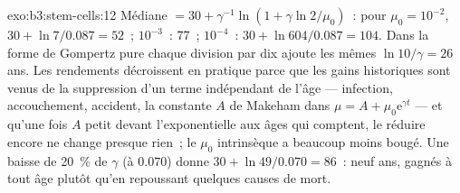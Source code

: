 \begin{solution}{exo:b3:stem-cells:12}
Médiane $= 30 + \gamma^{-1}\ln(1 + \gamma\ln 2/\mu_{0})$~: pour $\mu_{0} =
10^{-2}$, $30 + \ln 7/0.087 = 52$~; $10^{-3}$~: 77~; $10^{-4}$~: $30 +
\ln 604/0.087 = 104$. Dans la forme de Gompertz pure chaque division par
dix ajoute les mêmes $\ln 10/\gamma = 26$ ans. Les rendements
décroissent en pratique parce que les gains historiques sont venus de la
suppression d'un terme indépendant de l'âge --- infection, accouchement,
accident, la constante $A$ de Makeham dans $\mu = A
+ \mu_{0}\mathrm{e}^{\gamma t}$ --- et qu'une fois $A$ petit devant
l'exponentielle aux âges qui comptent, le réduire encore ne change
presque rien~; le $\mu_{0}$ intrinsèque a beaucoup moins bougé. Une
baisse de \qty{20}{\%} de $\gamma$ (à $0.070$) donne
$30 + \ln 49/0.070 = 86$~: neuf ans, gagnés à tout âge plutôt qu'en
repoussant quelques causes de mort.
\end{solution}

